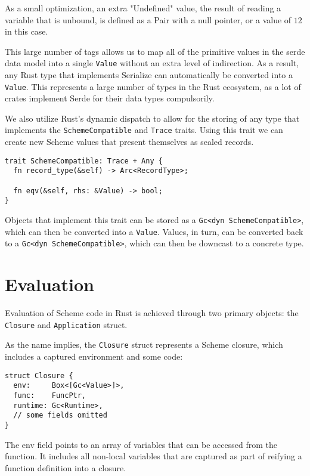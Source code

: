 \documentclass[sigplan,review,anonymous]{acmart}
\begin{document}
As a small optimization, an extra "Undefined" value, the result of reading a
variable that is unbound, is defined as a Pair with a null pointer, or a value
of $12$ in this case.

This large number of tags allows us to map all of the primitive values in the
serde data model\cite{serde} into a single \texttt{Value} without an extra level of
indirection. As a result, any Rust type that implements Serialize can
automatically be converted into a \texttt{Value}. This represents a large number of
types in the Rust ecosystem, as a lot of crates implement Serde for their data types
compulsorily.

We also utilize Rust's dynamic dispatch to allow for the storing of any type that
implements the \texttt{SchemeCompatible} and \texttt{Trace} traits. Using this
trait we can create new Scheme values that present themselves as sealed records.

\begin{verbatim}
trait SchemeCompatible: Trace + Any {
  fn record_type(&self) -> Arc<RecordType>;

  fn eqv(&self, rhs: &Value) -> bool;
}
\end{verbatim}

Objects that implement this trait can be stored as a \texttt{Gc<dyn SchemeCompatible>},
which can then be converted into a \texttt{Value}. Values, in turn, can be converted
back to a \texttt{Gc<dyn SchemeCompatible>}, which can then be downcast to a concrete
type.

\section{Evaluation}

Evaluation of Scheme code in Rust is achieved through two primary objects: the
\texttt{Closure} and \texttt{Application} struct.

As the name implies, the \texttt{Closure} struct represents a Scheme closure,
which includes a captured environment and some code:

\begin{verbatim}
struct Closure {
  env:     Box<[Gc<Value>]>,
  func:    FuncPtr,
  runtime: Gc<Runtime>,
  // some fields omitted
}
\end{verbatim}

The env field points to an array of variables that can be accessed from the
function. It includes all non-local variables that are captured as part of
reifying a function definition into a closure.
\end{document}
